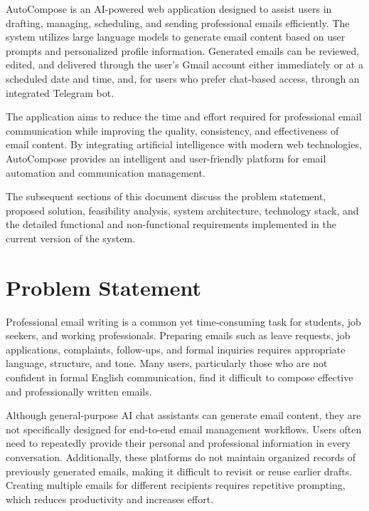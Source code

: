 \documentclass[12pt,a4paper]{article}
\begin{document}
AutoCompose is an AI-powered web application designed to assist users in drafting, managing, scheduling, and sending professional emails efficiently. The system utilizes large language models to generate email content based on user prompts and personalized profile information. Generated emails can be reviewed, edited, and delivered through the user's Gmail account either immediately or at a scheduled date and time, and, for users who prefer chat-based access, through an integrated Telegram bot.

The application aims to reduce the time and effort required for professional email communication while improving the quality, consistency, and effectiveness of email content. By integrating artificial intelligence with modern web technologies, AutoCompose provides an intelligent and user-friendly platform for email automation and communication management.

The subsequent sections of this document discuss the problem statement, proposed solution, feasibility analysis, system architecture, technology stack, and the detailed functional and non-functional requirements implemented in the current version of the system.




\section{Problem Statement}

Professional email writing is a common yet time-consuming task for students, job seekers, and working professionals. Preparing emails such as leave requests, job applications, complaints, follow-ups, and formal inquiries requires appropriate language, structure, and tone. Many users, particularly those who are not confident in formal English communication, find it difficult to compose effective and professionally written emails.

Although general-purpose AI chat assistants can generate email content, they are not specifically designed for end-to-end email management workflows. Users often need to repeatedly provide their personal and professional information in every conversation. Additionally, these platforms do not maintain organized records of previously generated emails, making it difficult to revisit or reuse earlier drafts. Creating multiple emails for different recipients requires repetitive prompting, which reduces productivity and increases effort.
\end{document}
